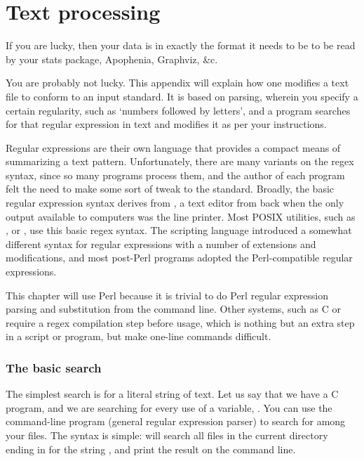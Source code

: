 \chapter{Text processing} \label{textappendix}

If you are lucky, then your data is in exactly the format it needs to be
to be read by your stats package, Apophenia, Graphviz, \&c. 

You are probably not lucky. This appendix will explain how one modifies
a text file to conform to an input standard. It is based on  parsing, wherein you specify a certain regularity, such as
`numbers followed by letters', and a program searches for that regular
expression in text and modifies it as per your instructions. 

Regular expressions are their own language that provides a compact means
of summarizing a text pattern. Unfortunately, there are many variants on the
regex syntax, since so many programs process them, and the author of
each program felt the need to make some sort of tweak to the standard.
Broadly, the basic regular expression syntax derives from , a
text editor from back when the only output available to computers was
the line printer. Most POSIX utilities, such as , 
 or , use this basic regex syntax. The scripting language
 introduced a somewhat different syntax for regular
expressions with a number of extensions and modifications, and most
post-Perl programs adopted the Perl-compatible regular expressions. 

This chapter will use Perl because it is trivial to do Perl regular
expression parsing and substitution from the command line. Other
systems, such as C or  require a regex compilation step
before usage, which is nothing but an extra step in a script or program,
but make one-line commands difficult.

\subsection{The basic search}
The simplest search is for a literal string of text. Let us say that we
have a C program, and we are searching for every use of a variable,
. You can use the command-line program  (general
regular expression parser) to search for  among your files. The
syntax is simple:  will search all files in the current
directory ending in  for the string , and print the result
on the command line.

